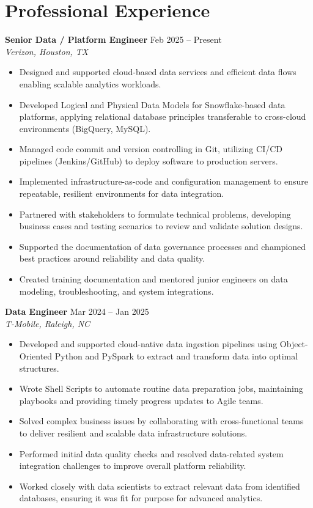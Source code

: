\documentclass[10pt]{article}
\begin{document}
\section*{Professional Experience}

\textbf{Senior Data / Platform Engineer} \hfill Feb 2025 -- Present \\ %
\textit{Verizon, Houston, TX}
\begin{itemize}[leftmargin=*, itemsep=3pt]
    \item Designed and supported cloud-based data services and efficient data flows enabling scalable analytics workloads. %
    \item Developed Logical and Physical Data Models for Snowflake-based data platforms, applying relational database principles transferable to cross-cloud environments (BigQuery, MySQL). %
    \item Managed code commit and version controlling in Git, utilizing CI/CD pipelines (Jenkins/GitHub) to deploy software to production servers. %
    \item Implemented infrastructure-as-code and configuration management to ensure repeatable, resilient environments for data integration. %
    \item Partnered with stakeholders to formulate technical problems, developing business cases and testing scenarios to review and validate solution designs. %
    \item Supported the documentation of data governance processes and championed best practices around reliability and data quality. %
    \item Created training documentation and mentored junior engineers on data modeling, troubleshooting, and system integrations. %
\end{itemize}

\textbf{Data Engineer} \hfill Mar 2024 -- Jan 2025 \\ %
\textit{T-Mobile, Raleigh, NC}
\begin{itemize}[leftmargin=*, itemsep=3pt]
    \item Developed and supported cloud-native data ingestion pipelines using Object-Oriented Python and PySpark to extract and transform data into optimal structures. %
    \item Wrote Shell Scripts to automate routine data preparation jobs, maintaining playbooks and providing timely progress updates to Agile teams. %
    \item Solved complex business issues by collaborating with cross-functional teams to deliver resilient and scalable data infrastructure solutions. %
    \item Performed initial data quality checks and resolved data-related system integration challenges to improve overall platform reliability. %
    \item Worked closely with data scientists to extract relevant data from identified databases, ensuring it was fit for purpose for advanced analytics. %
\end{itemize}
\end{document}
